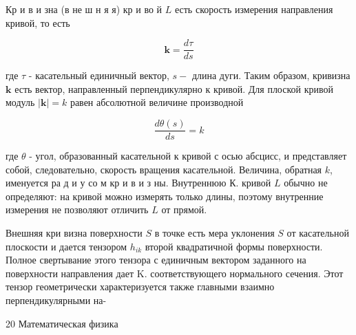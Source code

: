 \documentclass[10pt]{article}
\begin{document}
Кр и в и зна (в не ш н я я) кр и во й $L$ есть скорость измерения направления кривой, то есть



\[

\boldsymbol{k}=\frac{d \tau}{d s}

\]



где $\tau$ - касательный единичный вектор, $s-$ длина дуги. Таким образом, кривизна $\boldsymbol{k}$ есть вектор, направленный перпендикулярно к кривой. Для плоской кривой модуль $|\boldsymbol{k}|=k$ равен абсолютной величине производной



\[

\frac{d \theta(s)}{d s}=k

\]



где $\theta$ - угол, образованный касательной к кривой с осью абсцисс, и представляет собой, следовательно, скорость вращения касательной. Величина, обратная $k$, именуется ра д и у со м кр и в и з ны. Внутреннюю К. кривой $L$ обычно не определяют: на кривой можно измерять только длины, поэтому внутренние измерения не позволяют отличить $L$ от прямой.



Внешняя кри визна поверхности $S$ в точке есть мера уклонения $S$ от касательной плоскости и дается тензором $h_{i k}$ второй квадратичной формы поверхности. Полное свертывание этого тензора с единичным вектором заданного на поверхности направления дает $\mathrm{K}$. соответствующего нормального сечения. Этот тензор геометрически характеризуется также главными взаимно перпендикулярными на-



20 Математическая физика
\end{document}
